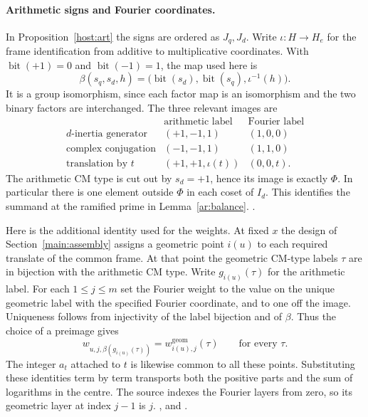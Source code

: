 \paragraph{Arithmetic signs and Fourier coordinates.}
In Proposition~\ref{host:art} the signs are ordered as \(J_q,J_d\).
Write \(\iota:H\longrightarrow H_e\) for the frame identification from
additive to multiplicative coordinates. With \(\operatorname{bit}(+1)=0\)
and \(\operatorname{bit}(-1)=1\), the map used here is
\[
  \beta(s_q,s_d,h)=
       \big(\operatorname{bit}(s_d),\operatorname{bit}(s_q),\iota^{-1}(h)\big).
\]
It is a group isomorphism, since each factor map is an isomorphism and
the two binary factors are interchanged. The three relevant images are
\[
\begin{array}{c|c|c}
 &\text{arithmetic label}&\text{Fourier label}\\ \hline
 d\text{-inertia generator}&(+1,-1,1)&(1,0,0)\\
 \text{complex conjugation}&(-1,-1,1)&(1,1,0)\\
 \text{translation by }t &(+1,+1,\iota(t))&(0,0,t).
\end{array}
\]
The arithmetic CM type is cut out by \(s_d=+1\), hence its image is
exactly \(\Phi\). In particular there is one element outside \(\Phi\)
in each coset of \(I_d\). This identifies the summand at the ramified
prime in Lemma~\ref{ar:balance}.
.

Here is the additional identity used for the weights. At fixed \(x\)
the design of Section~\ref{main:assembly} assigns a geometric point
\(i(u)\) to each required translate of the common frame. At that point
the geometric CM-type labels \(\tau\) are in bijection with the
arithmetic CM type. Write \(g_{i(u)}(\tau)\) for the arithmetic label.
For each \(1\le j\le m\) set the Fourier weight to the value on the
unique geometric label with the specified Fourier coordinate, and to
one off the image. Uniqueness follows from injectivity of the label
bijection and of \(\beta\). Thus the choice of a preimage gives
\[
 w_{u,j,\beta(g_{i(u)}(\tau))}
                 = w^{\mathrm{geom}}_{i(u),j}(\tau)
                 \qquad\text{for every }\tau .
\]
The integer \(a_t\) attached to \(t\) is likewise common to all these
points. Substituting these identities term by term transports
both the positive parts and the sum of logarithms in the centre.
The source indexes the Fourier layers from zero, so its geometric
layer at index \(j-1\) is \(j\).
,
 and
.

